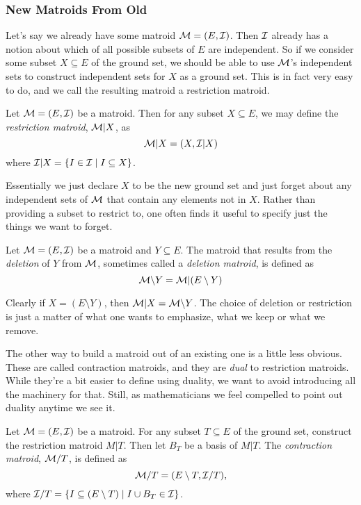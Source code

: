 \documentclass[12pt,oneside]{../../sfsuthesis}
\begin{document}
\subsubsection{New Matroids From Old}
Let's say we already have some matroid \( \mathcal{M} = (E, \mathcal{I}) \).
Then \( \mathcal{I} \) already has a notion about which of all possible subsets of \( E \) are independent.
So if we consider some subset \( X \subseteq E \) of the ground set, we should be able to use \( \mathcal{M} \)'s independent sets to construct independent sets for \( X \) as a ground set.
This is in fact very easy to do, and we call the resulting matroid a restriction matroid.

\begin{definition}\th\label{def:restrictionMatroid}
    Let \( \mathcal{M} = (E, \mathcal{I}) \) be a matroid.
    Then for any subset \( X \subseteq E \), we may define the \emph{restriction matroid}, \( \mathcal{M}|X \), as
    \[
        \mathcal{M}|X = ( X, \mathcal{I}|X )
    \]
    where \( \mathcal{I}|X = \{I \in \mathcal{I} \; | \; I \subseteq X\} \).
\end{definition}

Essentially we just declare \( X \) to be the new ground set and just forget about any independent sets of \( \mathcal{M} \) that contain any elements not in \( X \).
Rather than providing a subset to restrict to, one often finds it useful to specify just the things we want to forget.

\begin{definition}\th\label{def:deletionMatroid}
    Let \( \mathcal{M} = (E, \mathcal{I}) \) be a matroid and \( Y \subseteq E \).
    The matroid that results from the \emph{deletion} of \( Y \) from \( \mathcal{M} \), sometimes called a \emph{deletion matroid}, is defined as
    \[
        \mathcal{M} \backslash Y = \mathcal{M}|(E \setminus Y)
    \]
\end{definition}

Clearly if \( X = (E \setminus Y) \), then \( \mathcal{M}|X = \mathcal{M} \backslash Y \).
The choice of deletion or restriction is just a matter of what one wants to emphasize, what we keep or what we remove.

The other way to build a matroid out of an existing one is a little less obvious.
These are called contraction matroids, and they are \emph{dual} to restriction matroids.
While they're a bit easier to define using duality, we want to avoid introducing all the machinery for that.
Still, as mathematicians we feel compelled to point out duality anytime we see it.

\begin{definition}\th\label{def:contractionMatroid}

    Let \( \mathcal{M} = (E, \mathcal{I}) \) be a matroid.
    For any subset \( T \subseteq E \) of the ground set, construct the restriction matroid \( M|T \).
    Then let \( B_T \) be a basis of \( M|T \).
    The \emph{contraction matroid}, \( \mathcal{M}/T \), is defined as
    \[
        \mathcal{M}/T = ( E \setminus T, \mathcal{I}/T ),
    \]
    where \( \mathcal{I}/T = \{ I \subseteq (E \setminus T) \; | \; I \cup B_T \in \mathcal{I} \} \).

\end{definition}
\end{document}

